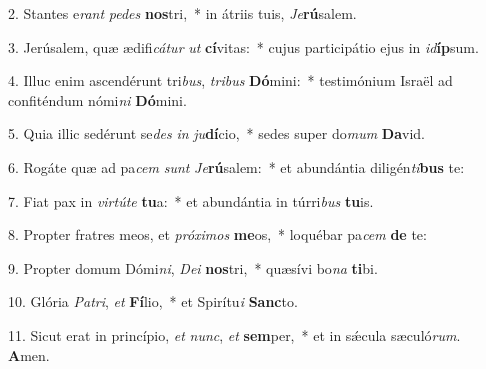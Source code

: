 2. Stantes e\textit{rant} \textit{pe}\textit{des} \textbf{nos}tri,~*  in átriis tuis, \textit{Je}\textbf{rú}salem.\

3. Jerúsalem, quæ ædifi\textit{cá}\textit{tur} \textit{ut} \textbf{cí}vitas:~*  cujus participátio ejus in \textit{id}\textbf{íp}sum.\

4. Illuc enim ascendérunt tri\textit{bus}, \textit{tri}\textit{bus} \textbf{Dó}mini:~*  testimónium Israël ad confiténdum nómi\textit{ni} \textbf{Dó}mini.\

5. Quia illic sedérunt se\textit{des} \textit{in} \textit{ju}\textbf{dí}cio,~*  sedes super do\textit{mum} \textbf{Da}vid.\

6. Rogáte quæ ad pa\textit{cem} \textit{sunt} \textit{Je}\textbf{rú}salem:~*  et abundántia diligén\textit{ti}\textbf{bus} te:\

7. Fiat pax in \textit{vir}\textit{tú}\textit{te} \textbf{tu}a:~*  et abundántia in túrri\textit{bus} \textbf{tu}is.\

8. Propter fratres meos, et \textit{pró}\textit{xi}\textit{mos} \textbf{me}os,~*  loquébar pa\textit{cem} \textbf{de} te:\

9. Propter domum Dómi\textit{ni}, \textit{De}\textit{i} \textbf{nos}tri,~*  quæsívi bo\textit{na} \textbf{ti}bi.\

10. Glória \textit{Pa}\textit{tri}, \textit{et} \textbf{Fí}lio,~*  et Spirítu\textit{i} \textbf{Sanc}to.\

11. Sicut erat in princípio, \textit{et} \textit{nunc}, \textit{et} \textbf{sem}per,~*  et in sǽcula sæculó\textit{rum}. \textbf{A}men.\

